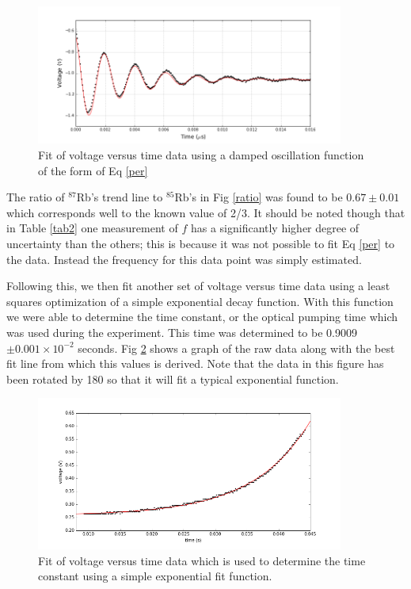 \documentclass[prb,preprint]{revtex4-1}
\begin{document}
\begin{figure}[h!]
\centering
\includegraphics[width=0.9\textwidth]{per_fit.png}
\caption{Fit of voltage versus time data using a damped oscillation function of the form of Eq \ref{per}}
\label{LC}
\end{figure}

\newpage
The ratio of $^{87}$Rb's trend line to $^{85}$Rb's in Fig \ref{ratio} was found to be $0.67\pm0.01$ which corresponds well to the known value of 2/3. It should be noted though that in Table \ref{tab2} one measurement of $f$ has a significantly higher degree of uncertainty than the others; this is because it was not possible to fit Eq \eqref{per} to the data. Instead the frequency for this data point was simply estimated.

Following this, we then fit another set of voltage versus time data using a least squares optimization of a simple exponential decay function. With this function we were able to determine the time constant, or the optical pumping time which was used during the experiment. This time was determined to be 0.9009$\pm0.001\times10^{-2}$ seconds. Fig \ref{LC1} shows a graph of the raw data along with the best fit line from which this values is derived. Note that the data in this figure has been rotated by 180 so that it will fit a typical exponential function.

\begin{figure}[h!]
\centering
\includegraphics[width=0.9\textwidth]{exp_fit.png}
\caption{Fit of voltage versus time data which is used to determine the time constant using a simple exponential fit function.}
\label{LC1}
\end{figure}
\end{document}
